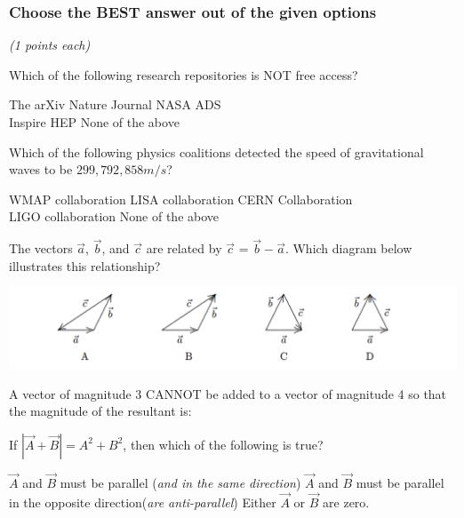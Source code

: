 \documentclass[12pt,addpoints]{exam}
\begin{document}
{{{				\subsubsection*{Choose the BEST answer out of the given options}\textit{(1 points each)} 
				\begin{questions}
					\question Which of the following research repositories is NOT free access? \\
					\begin{oneparchoices}
						\choice The arXiv
						\choice Nature Journal
						\choice NASA ADS \\
						\choice Inspire HEP
						\choice None of the above
					\end{oneparchoices}	
					\question Which of the following physics coalitions detected the speed of gravitational waves to be $299,792,858m/s$? \\
					\begin{oneparchoices}
						\choice WMAP collaboration
						\choice LISA collaboration 
						\choice CERN Collaboration \\
						\choice LIGO collaboration
						\choice None of the above
					\end{oneparchoices}
					\question  The vectors $\vec{a}$, $\vec{b}$, and $\vec{c}$ are related by $\vec{c}$ = $\vec{b}-\vec{a}$. Which diagram below illustrates this
					relationship?
					\begin{center}
						\includegraphics[scale=0.4]{vecs.png}
					\end{center}
					\question A vector of magnitude 3 CANNOT be added to a vector of magnitude 4 so that the magnitude of the resultant is:\\
					\begin{oneparchoices}
						\choice 0
						\choice 1
						\choice 3
						\choice 7
						\choice 5
					\end{oneparchoices}
					\question If $|\vec{A}+\vec{B}|=A^2+B^2$, then which of the following is true?
					\begin{choices}
						\choice $\vec{A}$ and $\vec{B}$ must be parallel (\textit{and in the same direction})
						\choice $\vec{A}$ and $\vec{B}$ must be parallel in the opposite direction(\textit{are anti-parallel})
						\choice Either $\vec{A}$ or $\vec{B}$ are zero.

\end{choices}
\end{questions}}}}
\end{document}
